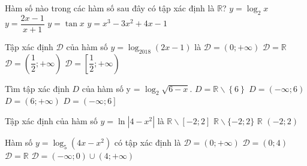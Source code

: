 \begin{ex}
	Hàm số nào trong các hàm số sau đây có tập xác định là $\mathbb R$?
	\choice
	{$y=\log_2x$}
	{$y=\dfrac{2x-1}{x+1}$}
	{$y=\tan x$}
	{\True $y=x^3-3x^2+4x-1$}
\end{ex}

\begin{ex}
	Tập xác định $ \mathscr{D} $ của hàm số $ y= \log_{2018} (2x - 1) $ là
	\choice
	{$ \mathscr{D} = (0;+\infty) $}
	{$ \mathscr{D} = \mathbb{R} $}
	{\True $ \mathscr{D} = \left (\dfrac{1}{2};+\infty \right )   $}
	{$ \mathscr{D} = \left [ \dfrac{1}{2};+\infty \right ) $}
\end{ex}

\begin{ex}
	Tìm tập xác định $D$ của hàm số y = $\log_2\sqrt{6-x}.$
	\choice
	{$D=\mathbb{R}\backslash \left\{6\right\}$}
	{$D=\left(-\infty; 6\right)$}
	{\True $D=\left(6;+\infty \right)$}
	{$D=\left(-\infty;6\right]$}
\end{ex}

\begin{ex}
	Tập xác định của hàm số $y=\ln |4-x^2|$ là
	\choice
	{  $\mathbb{R}\backslash [-2;2]$ }
	{\True $\mathbb{R}\backslash \{-2;2\}$  }
	{ $\mathbb{R}$ }
	{$(-2;2)$  }
\end{ex}

\begin{ex}
	Hàm số $y=\log_5 (4x-x^2)$ có tập xác định là 
	\choice
	{$\mathscr{D}=(0;+\infty)$}
	{\True $\mathscr{D}=(0;4)$}
	{$\mathscr{D}=\mathbb{R}$}
	{$\mathscr{D}=(-\infty;0)\cup (4;+\infty)$} 
\end{ex}

